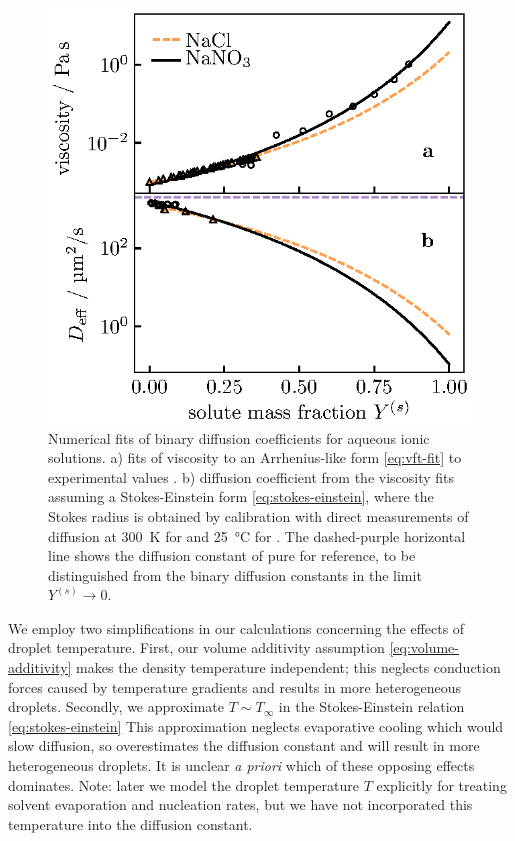 \documentclass[11pt,twoside]{report}
\begin{document}
\begin{figure}
  \includegraphics[width=0.9\linewidth,outer]{aerosol-diffusion-fit}
  \caption[Viscosity and diffusion coefficients of aqueous ionic solutions]{
    Numerical fits of binary diffusion coefficients for aqueous ionic solutions.
    a) fits of viscosity to an Arrhenius-like form \eqref{eq:vft-fit} to experimental values \cite{PowerCS2013,BaldelliAST2016}.
    b) diffusion coefficient from the viscosity fits assuming a Stokes-Einstein form \eqref{eq:stokes-einstein}, where the Stokes radius is obtained by calibration with direct measurements of diffusion at \SI{300}{\kelvin} for  \cite{LyubartsevJPC1996} and \SI{25}{\celsius} for  \cite{YehJCED1970}.
    The dashed-purple horizontal line shows the diffusion constant of pure  for reference, to be distinguished from the binary diffusion constants in the limit $Y^{(s)} \to 0$.}
  \label{fig:diffusion-fit}
\end{figure}

We employ two simplifications in our calculations concerning the effects of droplet temperature.
First, our volume additivity assumption \eqref{eq:volume-additivity} makes the density temperature independent; this neglects conduction forces caused by temperature gradients and results in more heterogeneous droplets.
Secondly, we approximate $T \sim T_\infty$ in the Stokes-Einstein relation \eqref{eq:stokes-einstein}
This approximation neglects evaporative cooling which would slow diffusion, so overestimates the diffusion constant and will result in more heterogeneous droplets.
It is unclear \emph{a priori} which of these opposing effects dominates.
Note: later we model the droplet temperature $T$ explicitly for treating solvent evaporation and nucleation rates, but we have not incorporated this temperature into the diffusion constant.
\end{document}
